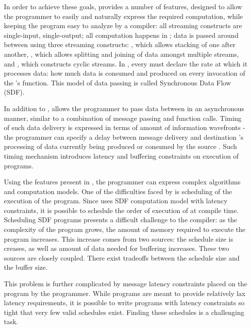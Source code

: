 In order to achieve these goals, {\StreamIt} provides a number of
features, designed to allow the programmer to easily and naturally
express the required computation, while keeping the program easy
to analyze by a compiler: all {\StreamIt} streaming constructs are
single-input, single-output; all computation happens in {\filters};
data is passed around between {\filters} using three streaming
constructs: {\pipeline}, which allows stacking of {\filters} one after
another, {\splitjoin}, which allows splitting and joining of data
amongst multiple streams, and {\feedbackloop}, which constructs
cyclic streams.  In {\StreamIt}, every {\filter} must declare the rate
at which it processes data: how much data is consumed and produced
on every invocation of the {\filter}'s {\work} function.  This model
of data passing is called Synchronous Data Flow (SDF).

In addition to \SDF, {\StreamIt} allows the programmer to pass data
between {\filters} in an asynchronous manner, similar to a
combination of message passing and function calls. Timing of such
data delivery is expressed in terms of amount of information
wavefronts - the programmer can specify a delay between message
delivery and destination {\filter}'s processing of data currently
being produced or consumed by the source {\filter}.  Such timing
mechanism introduces latency and buffering constraints on
execution of {\StreamIt} programs.

Using the features present in {\StreamIt}, the programmer can
express complex algorithms and computation models.  One of the
difficulties faced by {\StreamIt} is scheduling of the execution of
the program.  Since {\StreamIt} uses SDF computation model with
latency constraints, it is possible to schedule the order of
execution of {\filters} at compile time.  Scheduling SDF programs
presents a difficult challenge to the compiler:  as the complexity
of the program grows, the amount of memory required to execute the
program increases.  This increase comes from two sources: the
schedule size is creases, as well as amount of data needed for
buffering increases.  These two sources are closely coupled. There
exist tradeoffs between the schedule size and the buffer size.

This problem is further complicated by message latency constraints
placed on the program by the programmer.  While {\StreamIt} programs
are meant to provide relatively lax latency requirements, it is
possible to write programs with latency constraints so tight that
very few valid schedules exist. Finding these schedules is a
challenging task.

